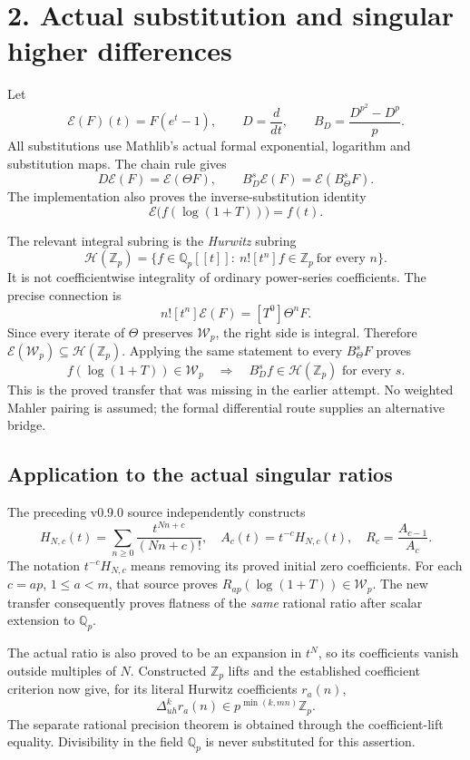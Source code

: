 \documentclass[11pt]{article}
\newcommand{\Z}{\mathbb Z}\newcommand{\Q}{\mathbb Q}\newcommand{\N}{\mathbb N}
\newcommand{\Wp}{\mathcal W_p}\newcommand{\Hp}{\mathcal H(\Z_p)}
\begin{document}
\section*{2. Actual substitution and singular higher differences}
Let
\[
 \mathcal E(F)(t)=F(e^t-1),\qquad D=\frac{d}{dt},\qquad
 B_D=\frac{D^{p^2}-D^p}{p}.
\]
All substitutions use Mathlib's actual formal exponential, logarithm and substitution maps. The chain rule gives
\[
 D\mathcal E(F)=\mathcal E(\Theta F),\qquad
 B_D^s\mathcal E(F)=\mathcal E(B_\Theta^sF).
\]
The implementation also proves the inverse-substitution identity
\[
 \mathcal E\bigl(f(\log(1+T))\bigr)=f(t).
\]

The relevant integral subring is the \emph{Hurwitz} subring
\[
 \Hp=\{f\in\Q_p[[t]]:\ n![t^n]f\in\Z_p\ \text{for every }n\}.
\]
It is not coefficientwise integrality of ordinary power-series coefficients. The precise connection is
\[
 n![t^n]\mathcal E(F)=[T^0]\Theta^nF.
\]
Since every iterate of $\Theta$ preserves $\Wp$, the right side is integral. Therefore $\mathcal E(\Wp)\subseteq\Hp$. Applying the same statement to every $B_\Theta^sF$ proves
\[
 \boxed{f(\log(1+T))\in\Wp\quad\Longrightarrow\quad
 B_D^sf\in\Hp\text{ for every }s.}
\]
This is the proved transfer that was missing in the earlier attempt. No weighted Mahler pairing is assumed; the formal differential route supplies an alternative bridge.

\subsection*{Application to the actual singular ratios}
The preceding v0.9.0 source independently constructs
\[
 H_{N,c}(t)=\sum_{n\ge0}\frac{t^{Nn+c}}{(Nn+c)!},\quad
 A_c(t)=t^{-c}H_{N,c}(t),\quad R_c=\frac{A_{c-1}}{A_c}.
\]
The notation $t^{-c}H_{N,c}$ means removing its proved initial zero coefficients. For each $c=ap$, $1\le a<m$, that source proves
$R_{ap}(\log(1+T))\in\Wp$. The new transfer consequently proves flatness of the \emph{same} rational ratio after scalar extension to $\Q_p$.

The actual ratio is also proved to be an expansion in $t^N$, so its coefficients vanish outside multiples of $N$. Constructed $\Z_p$ lifts and the established coefficient criterion now give, for its literal Hurwitz coefficients $r_a(n)$,
\[
 \boxed{\Delta_{uh}^{k}r_a(n)\in p^{\min(k,mn)}\Z_p.}
\]
The separate rational precision theorem is obtained through the coefficient-lift equality. Divisibility in the field $\Q_p$ is never substituted for this assertion.
\end{document}
